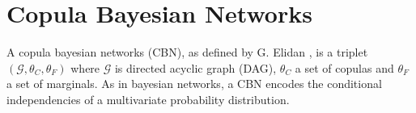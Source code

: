 \section{Copula Bayesian Networks}

A copula bayesian networks (CBN), as defined by G. Elidan
\cite{cbn_elidan_2010}, is a triplet $\left(\mathcal{G}, \theta_C,
\theta_F\right)$ where $\mathcal{G}$ is directed acyclic graph
(DAG), $\theta_C$ a set of copulas and $\theta_F$ a set of marginals.
As in bayesian networks, a CBN encodes the conditional independencies
of a multivariate probability distribution. 